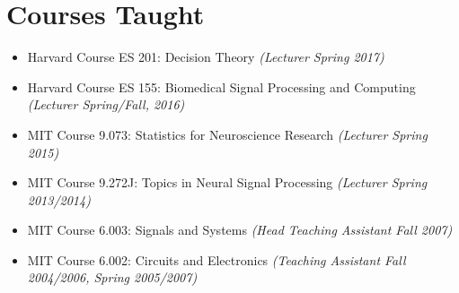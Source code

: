 \section*{Courses Taught}

  \begin{itemize}
  	  \item Harvard Course ES 201: Decision Theory \emph{(Lecturer Spring 2017)}
   	  \item Harvard Course ES 155: Biomedical Signal Processing and Computing \emph{(Lecturer Spring/Fall, 2016)}
      \item MIT Course 9.073: Statistics for Neuroscience Research \emph{(Lecturer Spring 2015)}
      \item MIT Course 9.272J: Topics in Neural Signal Processing \emph{(Lecturer Spring 2013/2014)}
      \item MIT Course 6.003: Signals and Systems \emph{(Head Teaching Assistant Fall 2007)}
      \item MIT Course 6.002: Circuits and Electronics \emph{(Teaching Assistant Fall 2004/2006, Spring 2005/2007)}
  \end{itemize}
